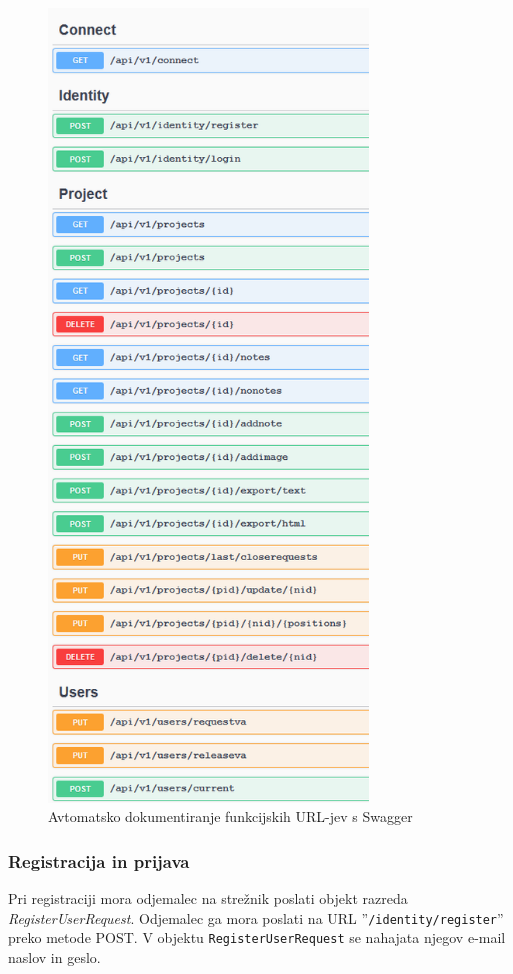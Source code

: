 \documentclass[a4paper, 12pt]{book}
\begin{document}
\begin{figure}[H]
\begin{center}
\includegraphics[width=8.5cm]{api_routes_small}
\end{center}
\caption{Avtomatsko dokumentiranje funkcijskih URL-jev s Swagger}
\label{api_routes}
\end{figure}

\subsubsection{Registracija in prijava}

Pri registraciji mora odjemalec na strežnik poslati objekt razreda \textit{RegisterUserRequest}.
Odjemalec ga mora poslati na URL ''\texttt{/identity/register}'' preko metode POST.
V objektu \texttt{RegisterUserRequest} se nahajata njegov e-mail naslov in geslo.
\end{document}
